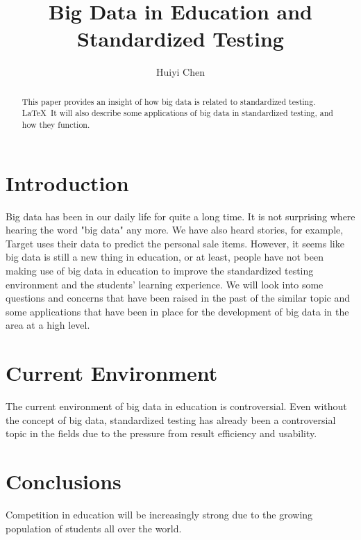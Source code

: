 \documentclass[sigconf]{acmart}
\begin{document}
\title{Big Data in Education and Standardized Testing}


\author{Huiyi Chen}



\renewcommand{\shortauthors}{H. CHEN}


\begin{abstract}
This paper provides an insight of how big data is related to standardized testing. \LaTeX\ It will also describe some applications of big data in standardized testing, and how they function.
\end{abstract}



\maketitle

\section{Introduction}

Big data has been in our daily life for quite a long time. It is not surprising where hearing the word "big data" any more. We have also heard stories, for example, Target uses their data to predict the personal sale items. However, it seems like big data is still a new thing in education, or at least, people have not been making use of big data in education to improve the standardized testing environment and the students' learning experience. We will look into some questions and concerns that have been raised in the past of the similar topic and some applications that have been in place for the development of big data in the area at a high level.


\section{Current Environment}
The current environment of big data in education is controversial. Even without the concept
of big data, standardized testing has already been a controversial topic in the fields due to the pressure from result efficiency and usability. 

\section{Conclusions}
Competition in education will be increasingly strong due to the growing population of students all over the world.\cite{Selingo2017}





 
\end{document}
